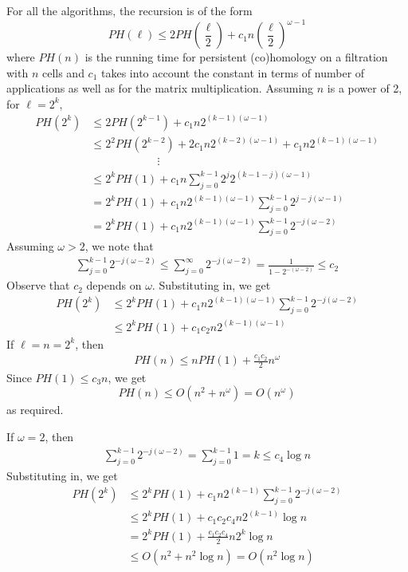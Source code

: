 \documentclass[10pt,a4paper]{article}
\newcommand{\matexp}{\omega}
\newcommand{\PH}{PH}
\begin{document}
For all the algorithms, the recursion is of the form
\[ \PH(\ell) \leq  2\PH\left(\frac{\ell}{2}\right) +c_1 n \left(\frac{\ell}{2}\right)^{\matexp-1} \]
where $\PH(n)$ is the running time for persistent (co)homology on a filtration with $n$ cells and
 $c_1$ takes into account the constant in terms of number of applications as well as for the matrix multiplication. 
Assuming $n$ is a power of 2, for $\ell = 2^k$,
\begin{align*}
 \PH(2^k) &\leq  2\PH(2^{k-1}) +c_1 n 2^{(k-1)(\matexp-1)} \\
 &\leq  2^2 \PH(2^{k-2})+2 c_1 n 2^{(k-2)(\matexp-1)} +c_1 n 2^{(k-1)(\matexp-1)}\\
 &\qquad\qquad\qquad\vdots\\
 &\leq  2^k \PH(1) + c_1 n \sum\limits_{j=0}^{k-1}2^{j}2^{(k-1-j)(\matexp-1)}\\
 & =  2^k \PH(1) + c_1 n 2^{(k-1)(\matexp-1)} \sum\limits_{j=0}^{k-1}2^{j-j(\matexp-1)}\\
 & =  2^k \PH(1) + c_1 n 2^{(k-1)(\matexp-1)} \sum\limits_{j=0}^{k-1}2^{-j(\matexp-2)}
 \end{align*}
Assuming $\matexp>2$, we note that 
\begin{align*}
\sum\limits_{j=0}^{k-1}2^{-j(\matexp-2)} \leq \sum\limits_{j=0}^{\infty}2^{-j(\matexp-2)} 
= \frac{1}{1-2^{-(\matexp-2)}} \leq c_2
 \end{align*}
 Observe that $c_2$ depends on $\matexp$.
 Substituting in, we get
 \begin{align*}
 \PH(2^k) &\leq  2^k \PH(1) + c_1 n 2^{(k-1)(\matexp-1)} \sum\limits_{j=0}^{k-1}2^{-j(\matexp-2)} \\
 &\leq 2^k \PH(1) + c_1 c_2 n 2^{(k-1)(\matexp-1)}
 \end{align*}
If $\ell = n = 2^k$, then
\begin{align*}
\PH(n) \leq n \PH(1) +\frac{c_1 c_2}{2} n^{\matexp} 
\end{align*}
Since $\PH(1)\leq  c_3 n$, we get
\[\PH(n) \leq O(n^2 + n^{\matexp}) = O(n^{\matexp})\]
as required. 

If $\matexp=2$, then 
\begin{align*}
\sum\limits_{j=0}^{k-1}2^{-j(\matexp-2)} =  \sum\limits_{j=0}^{k-1} 1 
 =   k  \leq c_4 \log n
 \end{align*}
 Substituting in, we get 
 \begin{align*}
 \PH(2^k) &\leq  2^k \PH(1) + c_1 n 2^{(k-1)} \sum\limits_{j=0}^{k-1}2^{-j(\matexp-2)} \\
 &\leq 2^k \PH(1) + c_1 c_2 c_4 n 2^{(k-1)} \log n\\
 &=  2^k \PH(1) + \frac{c_1 c_2 c_4}{2} n 2^{k} \log n\\
 & \leq O(n^{2}+n^2 \log n ) =  O(n^2 \log n) 
 \end{align*}
\end{document}
